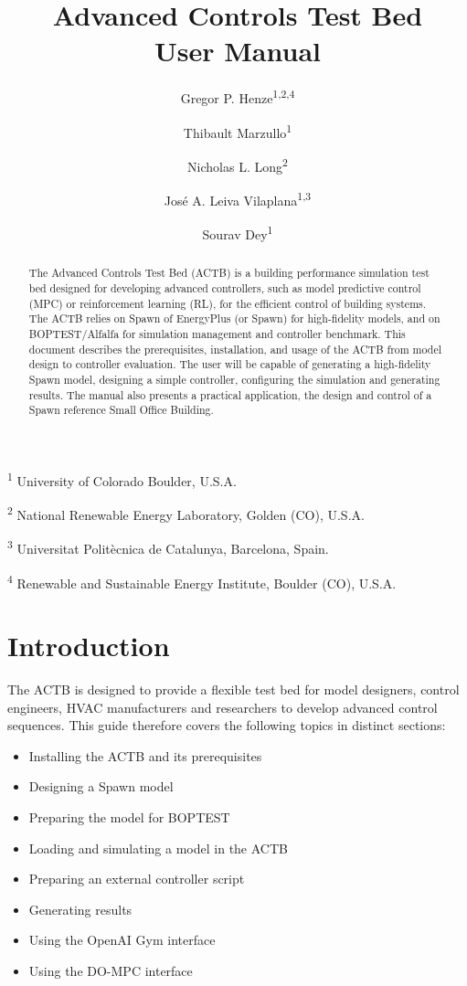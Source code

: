 \documentclass{article}
\title{Advanced Controls Test Bed \\ User Manual}
\author{
  Gregor P. Henze\textsuperscript{1,2,4}
  \and
  Thibault Marzullo\textsuperscript{1} 
  \and
  Nicholas L. Long\textsuperscript{2} 
  \and
  José A. Leiva Vilaplana\textsuperscript{1,3} 
  \and
  Sourav Dey\textsuperscript{1} 
}
\begin{document}
\maketitle

\textsuperscript{1} University of Colorado Boulder, U.S.A.

\textsuperscript{2} National Renewable Energy Laboratory, Golden (CO), U.S.A.

\textsuperscript{3} Universitat Politècnica de Catalunya, Barcelona, Spain.

\textsuperscript{4} Renewable and Sustainable Energy Institute, Boulder (CO), U.S.A.

\begin{abstract}
The Advanced Controls Test Bed (ACTB) is a building performance simulation test bed designed for developing advanced controllers, such as model predictive control (MPC) or reinforcement learning (RL), for the efficient control of building systems. The ACTB relies on Spawn of EnergyPlus (or Spawn) for high-fidelity models, and on BOPTEST/Alfalfa for simulation management and controller benchmark.
This document describes the prerequisites, installation, and usage of the ACTB from model design to controller evaluation. The user will be capable of generating a high-fidelity Spawn model, designing a simple controller, configuring the simulation and generating results. The manual also presents a practical application, the design and control of a Spawn reference Small Office Building.
\end{abstract}

\section{Introduction}\label{s:intro}

The ACTB is designed to provide a flexible test bed for model designers, control engineers, HVAC manufacturers and researchers to develop advanced control sequences. This guide therefore covers the following topics in distinct sections:
\begin{itemize}
    \item Installing the ACTB and its prerequisites
    \item Designing a Spawn model
    \item Preparing the model for BOPTEST
    \item Loading and simulating a model in the ACTB
    \item Preparing an external controller script
    \item Generating results
    \item Using the OpenAI Gym interface
    \item Using the DO-MPC interface
\end{itemize}
\end{document}
